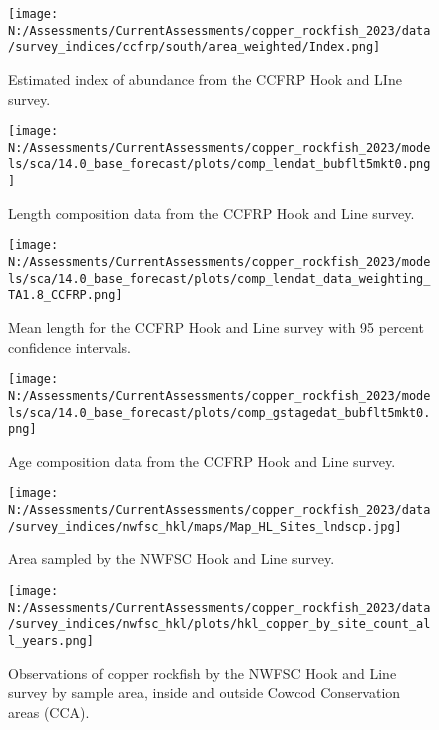 \documentclass[11pt,
  english,
  letterpaper,
]{article}
\begin{document}
\pagebreak

\begin{figure}
\centering
\texttt{[image: N:/Assessments/CurrentAssessments/copper\_rockfish\_2023/data/survey\_indices/ccfrp/south/area\_weighted/Index.png]}
\caption{Estimated index of abundance from the CCFRP Hook and LIne survey.\label{fig:ccfrp-index-main}}
\end{figure}

\pagebreak

\begin{figure}
\centering
\texttt{[image: N:/Assessments/CurrentAssessments/copper\_rockfish\_2023/models/sca/14.0\_base\_forecast/plots/comp\_lendat\_bubflt5mkt0.png]}
\caption{Length composition data from the CCFRP Hook and Line survey.\label{fig:ccfrp-len-data}}
\end{figure}

\pagebreak

\begin{figure}
\centering
\texttt{[image: N:/Assessments/CurrentAssessments/copper\_rockfish\_2023/models/sca/14.0\_base\_forecast/plots/comp\_lendat\_data\_weighting\_TA1.8\_CCFRP.png]}
\caption{Mean length for the CCFRP Hook and Line survey with 95 percent confidence intervals.\label{fig:ccfrp-mean-len-data}}
\end{figure}

\pagebreak

\begin{figure}
\centering
\texttt{[image: N:/Assessments/CurrentAssessments/copper\_rockfish\_2023/models/sca/14.0\_base\_forecast/plots/comp\_gstagedat\_bubflt5mkt0.png]}
\caption{Age composition data from the CCFRP Hook and Line survey.\label{fig:ccfrp-age-data}}
\end{figure}

\pagebreak

\begin{figure}
\centering
\texttt{[image: N:/Assessments/CurrentAssessments/copper\_rockfish\_2023/data/survey\_indices/nwfsc\_hkl/maps/Map\_HL\_Sites\_lndscp.jpg]}
\caption{Area sampled by the NWFSC Hook and Line survey.\label{fig:nwfsc-hkl-map}}
\end{figure}

\pagebreak

\begin{figure}
\centering
\texttt{[image: N:/Assessments/CurrentAssessments/copper\_rockfish\_2023/data/survey\_indices/nwfsc\_hkl/plots/hkl\_copper\_by\_site\_count\_all\_years.png]}
\caption{Observations of copper rockfish by the NWFSC Hook and Line survey by sample area, inside and outside Cowcod Conservation areas (CCA).\label{fig:nwfsc-hkl-site}}
\end{figure}
\end{document}
